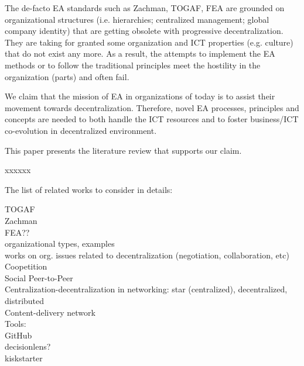 The de-facto EA standards such as Zachman, TOGAF, FEA are grounded on organizational structures (i.e. hierarchies; centralized management; global company identity) that are getting obsolete with progressive decentralization. They are taking for granted some organization and ICT properties (e.g. culture) that do not exist any more. As a result, the attempts to implement the EA methods or to follow the traditional principles meet the hostility in the organization (parts) and often fail.

We claim that the mission of EA in organizations of today is to assist their movement towards decentralization. Therefore, novel EA processes, principles and concepts are needed to both handle the ICT resources and to foster business/ICT co-evolution in decentralized environment.

This paper presents the literature review that supports our claim. 

xxxxxx


The list of related works to consider in details:

TOGAF \\
Zachman \\
FEA?? \\
organizational types, examples  \\
works on org. issues related to decentralization (negotiation, collaboration, etc) \\
Coopetition\\
Social Peer-to-Peer \\
Centralization-decentralization in networking: star (centralized), decentralized, distributed \\
Content-delivery network \\
Tools: \\
GitHub \\
decisionlens?\\
kiskstarter\\
